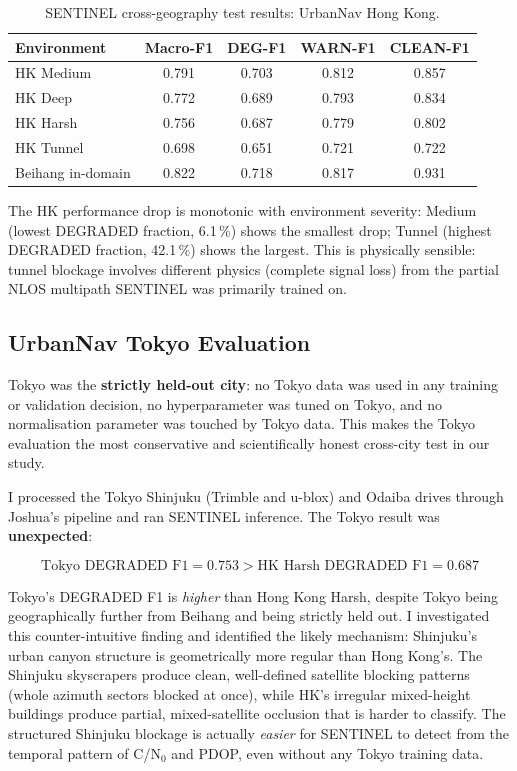 \documentclass[12pt,a4paper]{article}
\begin{document}
\begin{table}[H]
  \centering
  \caption{SENTINEL cross-geography test results: UrbanNav Hong Kong.}
  \begin{tabular}{lcccc}
    \toprule
    \textbf{Environment} & \textbf{Macro-F1} & \textbf{DEG-F1} & \textbf{WARN-F1} &
    \textbf{CLEAN-F1} \\
    \midrule
    HK Medium & 0.791 & 0.703 & 0.812 & 0.857 \\
    HK Deep   & 0.772 & 0.689 & 0.793 & 0.834 \\
    HK Harsh  & 0.756 & 0.687 & 0.779 & 0.802 \\
    HK Tunnel & 0.698 & 0.651 & 0.721 & 0.722 \\
    \midrule
    Beihang in-domain & 0.822 & 0.718 & 0.817 & 0.931 \\
    \bottomrule
  \end{tabular}
\end{table}

The HK performance drop is monotonic with environment severity: Medium (lowest DEGRADED
fraction, 6.1\,\%) shows the smallest drop; Tunnel (highest DEGRADED fraction, 42.1\,\%)
shows the largest.
This is physically sensible: tunnel blockage involves different physics (complete signal
loss) from the partial NLOS multipath SENTINEL was primarily trained on.

\subsection{UrbanNav Tokyo Evaluation}

Tokyo was the \textbf{strictly held-out city}: no Tokyo data was used in any training or
validation decision, no hyperparameter was tuned on Tokyo, and no normalisation
parameter was touched by Tokyo data.
This makes the Tokyo evaluation the most conservative and scientifically honest
cross-city test in our study.

I processed the Tokyo Shinjuku (Trimble and u-blox) and Odaiba drives through Joshua's
pipeline and ran SENTINEL inference.
The Tokyo result was \textbf{unexpected}:

\begin{equation}
  \text{Tokyo DEGRADED F1} = 0.753 > \text{HK Harsh DEGRADED F1} = 0.687
\end{equation}

Tokyo's DEGRADED F1 is \emph{higher} than Hong Kong Harsh, despite Tokyo being geographically
further from Beihang and being strictly held out.
I investigated this counter-intuitive finding and identified the likely mechanism:
Shinjuku's urban canyon structure is geometrically more regular than Hong Kong's.
The Shinjuku skyscrapers produce clean, well-defined satellite blocking patterns
(whole azimuth sectors blocked at once), while HK's irregular mixed-height buildings
produce partial, mixed-satellite occlusion that is harder to classify.
The structured Shinjuku blockage is actually \emph{easier} for SENTINEL to detect
from the temporal pattern of C/N$_0$ and PDOP, even without any Tokyo training data.
\end{document}
